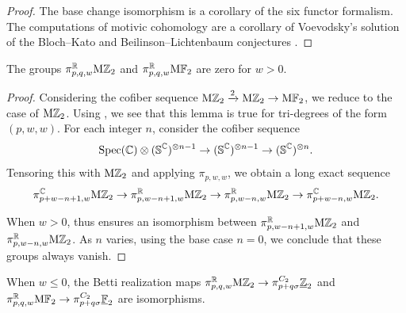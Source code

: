 \begin{proof}
  The base change isomorphism is a corollary of the six functor formalism. 
  The computations of motivic cohomology are a corollary of Voevodsky's solution of the Bloch--Kato and Beilinson--Lichtenbaum conjectures \cite{Voe03b}. 
%
\end{proof}

\begin{lem} \label{lem:Z-positive-w}
  The groups $\pi_{p,q,w}^{\mathbb{R}} \mathrm{M}\mathbb{Z}_{2}$ and $\pi_{p,q,w}^{\mathbb{R}} \mathrm{M}\mathbb{F}_2$ are zero for $w > 0$.
\end{lem}

\begin{proof}
  Considering the cofiber sequence $\mathrm{M}\mathbb{Z}_{2} \xrightarrow{2} \mathrm{M}\mathbb{Z}_{2} \to \mathrm{M}\mathbb{F}_2$, we reduce to the case of $\mathrm{M}\mathbb{Z}_{2}$.
  Using , we see that this lemma is true for tri-degrees of the form $(p,w,w)$.
  For each integer $n$, consider the cofiber sequence
$$\operatorname{\mathrm{Spec}}(\mathbb{C}) \otimes (\operatorname{\mathbb{S}}^{\mathbb{C}})^{\otimes n-1} \to (\operatorname{\mathbb{S}}^{\mathbb{C}})^{\otimes n-1} \to (\operatorname{\mathbb{S}}^{\mathbb{C}})^{\otimes n}.$$
Tensoring this with $\mathrm{M}\mathbb{Z}_{2}$ and applying $\pi_{p,w,w}$, we obtain a long exact sequence
$$\pi^{\mathbb{C}}_{p+w-n+1,w}  \mathrm{M}\mathbb{Z}_{2} \to \pi^{\mathbb{R}}_{p,w-n+1,w} \mathrm{M}\mathbb{Z}_{2} \to \pi^{\mathbb{R}}_{p,w-n,w} \mathrm{M}\mathbb{Z}_{2} \to \pi^{\mathbb{C}}_{p+w-n,w} \mathrm{M}\mathbb{Z}_{2}.$$

When $w>0$,  thus ensures an isomorphism between $\pi^{\mathbb{R}}_{p,w-n+1,w} \mathrm{M}\mathbb{Z}_{2}$ and $\pi^{\mathbb{R}}_{p,w-n,w} \mathrm{M}\mathbb{Z}_{2}$.  As $n$ varies, using the base case $n=0$, we conclude that these groups always vanish.
\end{proof}

\begin{lem} \label{lem:Zcalc}
  When $w \le 0$, the Betti realization maps
  $ \pi^{\mathbb{R}}_{p,q,w} \mathrm{M}\mathbb{Z}_{2} \to \pi^{C_2}_{p+q\sigma} \underline{\mathbb{Z}}_{2} $
  and 
  $ \pi^{\mathbb{R}}_{p,q,w} \mathrm{M}\mathbb{F}_2 \to \pi^{C_2}_{p+q\sigma} \underline{\mathbb{F}}_2 $
  are isomorphisms.
\end{lem}

